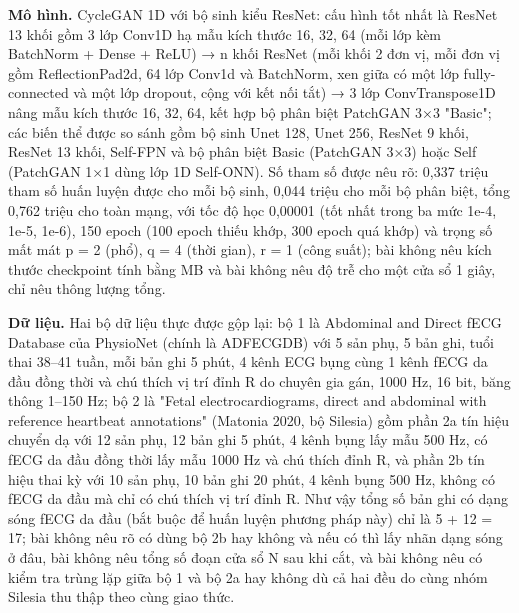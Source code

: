 \documentclass[12pt,a4paper]{article}
\begin{document}
\noindent \textbf{Mô hình.} CycleGAN 1D với bộ sinh kiểu ResNet: cấu hình tốt nhất là ResNet 13 khối gồm 3 lớp Conv1D hạ mẫu kích thước 16, 32, 64 (mỗi lớp kèm BatchNorm + Dense + ReLU) → n khối ResNet (mỗi khối 2 đơn vị, mỗi đơn vị gồm ReflectionPad2d, 64 lớp Conv1d và BatchNorm, xen giữa có một lớp fully-connected và một lớp dropout, cộng với kết nối tắt) → 3 lớp ConvTranspose1D nâng mẫu kích thước 16, 32, 64, kết hợp bộ phân biệt PatchGAN 3×3 "Basic"; các biến thể được so sánh gồm bộ sinh Unet 128, Unet 256, ResNet 9 khối, ResNet 13 khối, Self-FPN và bộ phân biệt Basic (PatchGAN 3×3) hoặc Self (PatchGAN 1×1 dùng lớp 1D Self-ONN). Số tham số được nêu rõ: 0,337 triệu tham số huấn luyện được cho mỗi bộ sinh, 0,044 triệu cho mỗi bộ phân biệt, tổng 0,762 triệu cho toàn mạng, với tốc độ học 0,00001 (tốt nhất trong ba mức 1e-4, 1e-5, 1e-6), 150 epoch (100 epoch thiếu khớp, 300 epoch quá khớp) và trọng số mất mát p = 2 (phổ), q = 4 (thời gian), r = 1 (công suất); bài không nêu kích thước checkpoint tính bằng MB và bài không nêu độ trễ cho một cửa sổ 1 giây, chỉ nêu thông lượng tổng.\par\vspace{3pt}
\noindent \textbf{Dữ liệu.} Hai bộ dữ liệu thực được gộp lại: bộ 1 là Abdominal and Direct fECG Database của PhysioNet (chính là ADFECGDB) với 5 sản phụ, 5 bản ghi, tuổi thai 38–41 tuần, mỗi bản ghi 5 phút, 4 kênh ECG bụng cùng 1 kênh fECG da đầu đồng thời và chú thích vị trí đỉnh R do chuyên gia gán, 1000 Hz, 16 bit, băng thông 1–150 Hz; bộ 2 là "Fetal electrocardiograms, direct and abdominal with reference heartbeat annotations" (Matonia 2020, bộ Silesia) gồm phần 2a tín hiệu chuyển dạ với 12 sản phụ, 12 bản ghi 5 phút, 4 kênh bụng lấy mẫu 500 Hz, có fECG da đầu đồng thời lấy mẫu 1000 Hz và chú thích đỉnh R, và phần 2b tín hiệu thai kỳ với 10 sản phụ, 10 bản ghi 20 phút, 4 kênh bụng 500 Hz, không có fECG da đầu mà chỉ có chú thích vị trí đỉnh R. Như vậy tổng số bản ghi có dạng sóng fECG da đầu (bắt buộc để huấn luyện phương pháp này) chỉ là 5 + 12 = 17; bài không nêu rõ có dùng bộ 2b hay không và nếu có thì lấy nhãn dạng sóng ở đâu, bài không nêu tổng số đoạn cửa sổ N sau khi cắt, và bài không nêu có kiểm tra trùng lặp giữa bộ 1 và bộ 2a hay không dù cả hai đều do cùng nhóm Silesia thu thập theo cùng giao thức.\par\vspace{3pt}
\end{document}
